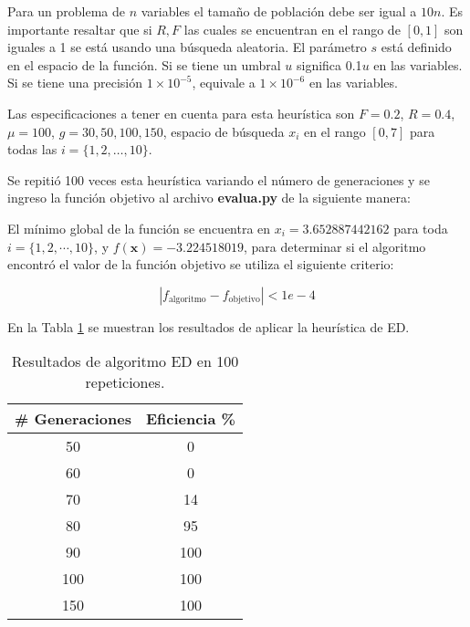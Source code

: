 \documentclass[conference]{IEEEtran}
\begin{document}
Para un problema de $n$ variables el tamaño de población debe ser igual a $10n$. Es importante resaltar que si $R, F$ las cuales se encuentran en el rango de $[0,1]$ son iguales a 1 se está usando una búsqueda aleatoria. El parámetro $s$ está definido en el espacio de la función. Si se tiene un umbral $u$ significa 0.1$u$ en las variables. Si se tiene una precisión $1 \times 10^{-5}$, equivale a $1 \times 10^{-6}$ en las variables.

Las especificaciones a tener en cuenta para esta heurística son $F = 0.2$, $R = 0.4$, $\mu = 100$, $g=30, 50, 100, 150$, espacio de búsqueda $x_{i} $ en el rango $ [0,7]$ para todas las $i = \{1, 2, \ldots,10\}$.

Se repitió 100 veces esta heurística variando el número de generaciones y se ingreso la función objetivo al archivo \textbf{evalua.py} de la siguiente manera:



El mínimo global de la función se encuentra en $x_{i} = 3.652887442162$ para toda $i = \{ 1,2,\cdots ,10\}$, y  $f(\mathbf{x}) = -3.224518019$, para determinar si el algoritmo encontró el valor de la función objetivo se utiliza el siguiente criterio:


\begin{equation}
|f_\text{algoritmo} - f_\text{objetivo} | < 1e-4
\end{equation}


En la Tabla \ref{tab:ED} se muestran los resultados de aplicar la heurística de  ED.

\begin{table}[!hbp]   
	\caption{Resultados de algoritmo ED en 100 repeticiones.}                                                                                                                
		\centering                                       
		\begin{tabular}{cc}
			\hline                                             
			\#{} Generaciones & Eficiencia \% \\                     
			\hline 
			50 & 0\\                                            
			60 & 0\\
			70 & 14\\
			80 & 95\\
			90 & 100\\
			100 & 100\\
			150 & 100\\
			\hline                                             
		\end{tabular}
		\label{tab:ED}
	\end{table}	
\end{document}
